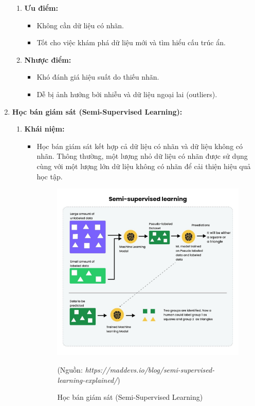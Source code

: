 \documentclass[13pt]{article}
\begin{document}
\begin{enumerate}
\begin{enumerate}
        \item \textbf{Ưu điểm:}
        \begin{itemize}
            \item Không cần dữ liệu có nhãn.
            \item Tốt cho việc khám phá dữ liệu mới và tìm hiểu cấu trúc ẩn.
        \end{itemize}
        \item \textbf{Nhược điểm:}
        \begin{itemize}
            \item Khó đánh giá hiệu suất do thiếu nhãn.
            \item Dễ bị ảnh hưởng bởi nhiễu và dữ liệu ngoại lai (outliers).
        \end{itemize}
    \end{enumerate}

    \item \textbf{Học bán giám sát (Semi-Supervised Learning): }
    \begin{enumerate}
        \item \textbf{Khái niệm:}
        \begin{itemize}
            \item Học bán giám sát kết hợp cả dữ liệu có nhãn và dữ liệu không có nhãn. Thông thường, một lượng nhỏ dữ liệu có nhãn được sử dụng cùng với một lượng lớn dữ liệu không có nhãn để cải thiện hiệu quả học tập.
            
    \begin{figure}[h!]
        \centering        \includegraphics[width=0.7\linewidth]{image/h7.jpg}
            \caption{Học bán giám sát (Semi-Supervised Learning)}
            \label{fig:label1}
            (Nguồn: \textit{https://maddevs.io/blog/semi-supervised-learning-explained/})
    \end{figure} 
        \end{itemize}


\end{enumerate}
\end{enumerate}
\end{document}

